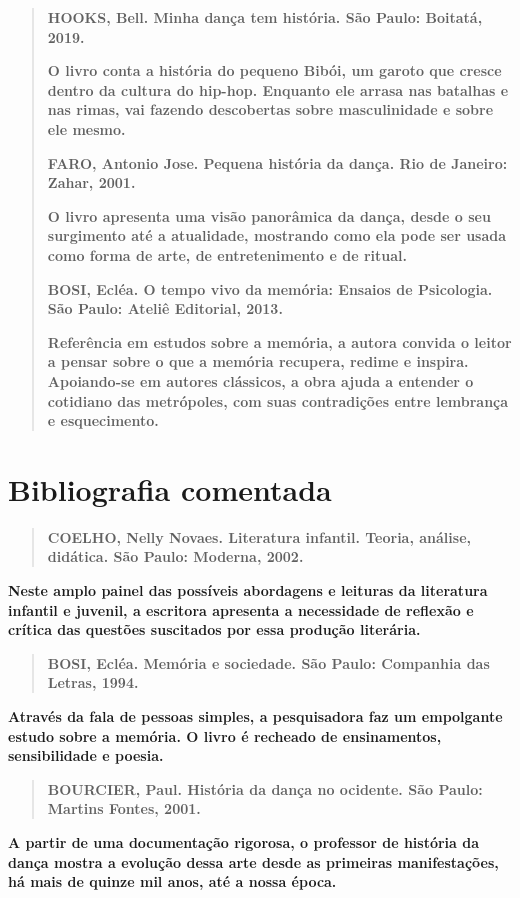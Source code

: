 \documentclass{extarticle}
\begin{document}
\begin{quote}
\textbf{HOOKS, Bell. Minha dança tem história. São Paulo: Boitatá,
2019.}

\textbf{O livro conta a história do pequeno Bibói, um garoto que cresce
dentro da cultura do hip-hop. Enquanto ele arrasa nas batalhas e nas
rimas, vai fazendo descobertas sobre masculinidade e sobre ele mesmo.}

\textbf{FARO, Antonio Jose. Pequena história da dança. Rio de Janeiro:
Zahar, 2001.}

\textbf{O livro apresenta uma visão panorâmica da dança, desde o seu
surgimento até a atualidade, mostrando como ela pode ser usada como
forma de arte, de entretenimento e de ritual.}

\textbf{BOSI, Ecléa. O tempo vivo da memória: Ensaios de Psicologia. São
Paulo: Ateliê Editorial, 2013.}

\textbf{Referência em estudos sobre a memória, a autora convida o leitor
a pensar sobre o que a memória recupera, redime e inspira. Apoiando-se
em autores clássicos, a obra ajuda a entender o cotidiano das
metrópoles, com suas contradições entre lembrança e esquecimento.}
\end{quote}


\section{Bibliografia comentada}

\begin{quote}
\textbf{COELHO, Nelly Novaes. Literatura infantil. Teoria, análise,
didática. São Paulo: Moderna, 2002.}
\end{quote}

\textbf{Neste amplo painel das possíveis abordagens e leituras da
literatura infantil e juvenil, a escritora apresenta a necessidade de
reflexão e crítica das questões suscitados por essa produção literária.}

\begin{quote}
\textbf{BOSI, Ecléa. Memória e sociedade. São Paulo: Companhia das
Letras, 1994.}
\end{quote}

\textbf{Através da fala de pessoas simples, a pesquisadora faz um
empolgante estudo sobre a memória. O livro é recheado de ensinamentos,
sensibilidade e poesia.}

\begin{quote}
\textbf{BOURCIER, Paul. História da dança no ocidente. São Paulo:
Martins Fontes, 2001.}
\end{quote}

\textbf{A partir de uma documentação rigorosa, o professor de história
da dança mostra a evolução dessa arte desde as primeiras manifestações,
há mais de quinze mil anos, até a nossa época.}
\end{document}
